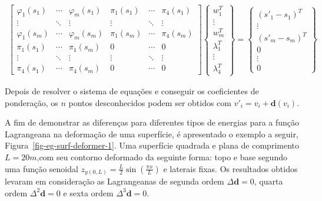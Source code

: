 \begin{align}
  \begin{bmatrix}
    \varphi_1(s_1) & \cdots & \varphi_m(s_1) & \pi_1(s_1) & \cdots & \pi_4(s_1)\\ 
    \vdots & \ddots & \vdots & \vdots & \ddots & \vdots\\
    \varphi_1(s_m) & \cdots & \varphi_m(s_m) & \pi_1(s_m) & \cdots & \pi_4(s_m)\\ 
    \pi_1(s_1) & \cdots & \pi_1(s_m) & 0 & \cdots & 0\\
    \vdots & \ddots & \vdots & \vdots & \ddots & \vdots\\
    \pi_4(s_1) & \cdots & \pi_4(s_m) & 0 & \cdots & 0
  \end{bmatrix}
  \begin{Bmatrix}
    w_1^T\\
    \vdots\\
    w_m^T\\
    \lambda_1^T\\
    \vdots\\
    \lambda_4^T
  \end{Bmatrix}=
  \begin{Bmatrix}
    (s'_1-s_1)^T\\
    \vdots\\
    (s'_m-s_m)^T\\
    0\\
    \vdots\\
    0
  \end{Bmatrix}\label{eq-ls-surf-deformer}
\end{align}

Depois de resolver o sistema de equações e conseguir os coeficientes de ponderação, os $n$ pontos desconhecidos podem ser obtidos com $v'_i=v_i+\boldsymbol{d}(v_i)$.

A fim de demonstrar as diferenças para diferentes tipos de energias para a função Lagrangeana na deformação de uma superfície, é apresentado o exemplo a seguir, Figura~\ref{fig-eg-surf-deformer-1}. Uma superfície quadrada e plana de comprimento $L=20m$,com seu contorno deformado da seguinte forma: topo e base segundo uma função senoidal $z_{y(0,L)}=\frac{L}{2}\sin(\frac{\pi x}{L})$ e laterais fixas. Os resultados obtidos levaram em consideração as Lagrangeanas de segunda ordem $\Delta\boldsymbol{d}=0$, quarta ordem $\Delta^2\boldsymbol{d}=0$ e sexta ordem $\Delta^3\boldsymbol{d}=0$.

